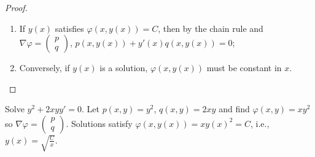     \begin{proof}
        \begin{enumerate}
            \item If \(y(x)\) satisfies  \(\varphi(x,y(x))=C\), then by the chain rule and \(\nabla \varphi =   \left(\begin{smallmatrix}
                p \\ q
            \end{smallmatrix}\right)\), \(p(x,y(x)) + y'(x) q(x,y(x)) = 0\);
            \item Conversely, if \(y(x)\) is a solution, \(\varphi(x,y(x))\) must be constant in \(x\). \qedhere 
        \end{enumerate}
    \end{proof}

    \begin{example}
        Solve \(y^2 + 2xyy' = 0\).
        Let \(p(x,y) = y^2\), \(q(x,y) = 2xy\) and find \(\varphi(x,y) = xy^2\) so \(\nabla \varphi = \left(\begin{smallmatrix}
            p\\ q
        \end{smallmatrix}\right)\).
        Solutions satisfy \(\varphi(x,y(x))= x y(x)^2 =C\), i.e., \(y(x) = \sqrt{\frac{C}{x}}\). 
    \end{example}










